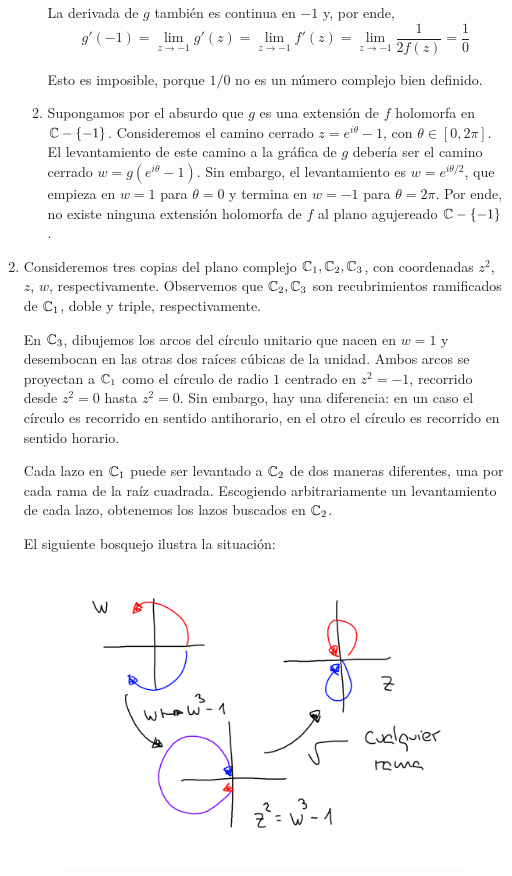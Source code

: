 \begin{solution}
\begin{enumerate}[label=\alph*)]
\begin{enumerate}[label=\arabic*)]
        La derivada de $g$ también es continua en $-1$ y, por ende,
        $$g'(-1) = \lim_{z \to -1} g'(z) = \lim_{z \to -1} f'(z) = \lim_{z \to -1} \frac 1 {2 f(z)} = \frac 10$$
        
        Esto es imposible, porque $1/0$ no es un número complejo bien definido.
        
        \item Supongamos por el absurdo que $g$ es una extensión de $f$ holomorfa en $\mathbb C - \{ -1 \}$. Consideremos el camino cerrado $z = e^{i\theta} - 1$, con $\theta \in [0, 2\pi]$. El levantamiento de este camino a la gráfica de $g$ debería ser el camino cerrado $w = g(e^{i\theta} - 1)$. Sin embargo, el levantamiento es $w = e^{i\theta/2}$, que empieza en $w = 1$ para $\theta = 0$ y termina en $w = -1$ para $\theta = 2\pi$. Por ende, no existe ninguna extensión holomorfa de $f$ al plano agujereado $\mathbb C - \{ -1 \}$.
    \end{enumerate}
    
    \item Consideremos tres copias del plano complejo $\mathbb C_1, \mathbb C_2, \mathbb C_3$, con coordenadas $z^2$, $z$, $w$, respectivamente. Observemos que $\mathbb C_2, \mathbb C_3$ son recubrimientos ramificados de $\mathbb C_1$, doble y triple, respectivamente.
    
    En $\mathbb C_3$, dibujemos los arcos del círculo unitario que nacen en $w = 1$ y desembocan en las otras dos raíces cúbicas de la unidad. Ambos arcos se proyectan a $\mathbb C_1$ como el círculo de radio $1$ centrado en $z^2 = -1$, recorrido desde $z^2 = 0$ hasta $z^2 = 0$. Sin embargo, hay una diferencia: en un caso el círculo es recorrido en sentido antihorario, en el otro el círculo es recorrido en sentido horario.
    
    Cada lazo en $\mathbb C_1$ puede ser levantado a $\mathbb C_2$ de dos maneras diferentes, una por cada rama de la raíz cuadrada. Escogiendo arbitrariamente un levantamiento de cada lazo, obtenemos los lazos buscados en $\mathbb C_2$.
    
    El siguiente bosquejo ilustra la situación:
    \begin{figure}[h]
        \centering
        \includegraphics[scale=0.3]{ramification.png}
    \end{figure}
    

\end{enumerate}
\end{solution}
